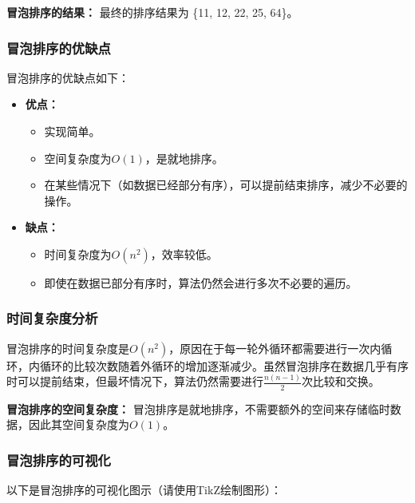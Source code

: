 \documentclass{article}
\begin{document}
\noindent
\textbf{冒泡排序的结果：}
最终的排序结果为 \{11, 12, 22, 25, 64\}。

\subsubsection{冒泡排序的优缺点}
冒泡排序的优缺点如下：

\begin{itemize}
    \item \textbf{优点：}
    \begin{itemize}
        \item 实现简单。
        \item 空间复杂度为$O(1)$，是就地排序。
        \item 在某些情况下（如数据已经部分有序），可以提前结束排序，减少不必要的操作。
    \end{itemize}
    \item \textbf{缺点：}
    \begin{itemize}
        \item 时间复杂度为$O(n^2)$，效率较低。
        \item 即使在数据已部分有序时，算法仍然会进行多次不必要的遍历。
    \end{itemize}
\end{itemize}

\subsubsection{时间复杂度分析}
冒泡排序的时间复杂度是$O(n^2)$，原因在于每一轮外循环都需要进行一次内循环，内循环的比较次数随着外循环的增加逐渐减少。虽然冒泡排序在数据几乎有序时可以提前结束，但最坏情况下，算法仍然需要进行$\frac{n(n-1)}{2}$次比较和交换。

\noindent
\textbf{冒泡排序的空间复杂度：}
冒泡排序是就地排序，不需要额外的空间来存储临时数据，因此其空间复杂度为$O(1)$。

\subsubsection{冒泡排序的可视化}
以下是冒泡排序的可视化图示（请使用TikZ绘制图形）：

\end{document}
